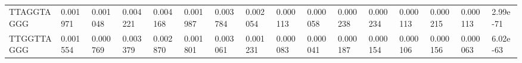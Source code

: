 \begin{samepage}
\begin{table}[h!]
\begin{tabular}{llllllllllllllll}
TTAGGTAGGG        &  0.001971                                          &  0.001048                            &  0.004221                 &  0.004168        &  0.001987        &  0.003784        &  0.002054        &  0.000113        &  0.000058        &  0.000238        &  0.000234        &  0.000113        &  0.000215        &  0.000113        &  2.99e-71 \\
TTGGTTAGGG        &  0.001554                                          &  0.000769                            &  0.003379                 &  0.002870        &  0.001801        &  0.003061        &  0.001231        &  0.000083        &  0.000041        &  0.000187        &  0.000154        &  0.000106        &  0.000156        &  0.000063        &  6.02e-63 \\
\hline
\end{tabular}
\caption{}
\label{}
\end{table}
\end{samepage}
